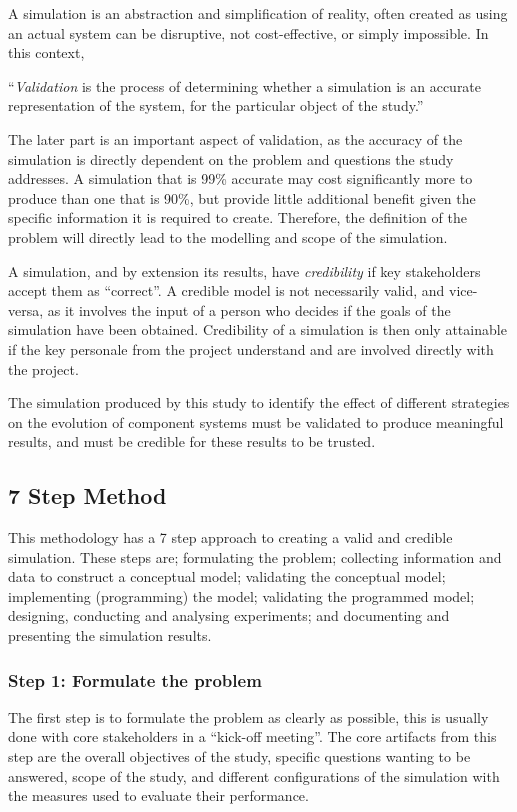 A simulation is an abstraction and simplification of reality, often created as using an actual system can be disruptive, not cost-effective, or simply impossible.
In this context,

``\textit{Validation} is the process of determining whether a simulation is an accurate representation of the system, for the particular object of the study.''

The later part is an important aspect of validation, as the accuracy of the simulation is directly dependent on the problem and questions the study addresses.
A simulation that is 99\% accurate may cost significantly more to produce than one that is 90\%, but provide little additional benefit given the specific information it is required to create.
Therefore, the definition of the problem will directly lead to the modelling and scope of the simulation.

A simulation, and by extension its results, have \textit{credibility} if key stakeholders accept them as ``correct''.
A credible model is not necessarily valid, and vice-versa, as it involves the input of a person who decides if the goals of the simulation have been obtained.
Credibility of a simulation is then only attainable if the key personale from the project understand and are involved directly with the project.

The simulation produced by this study to identify the effect of different strategies on the evolution of component systems must be validated to produce meaningful results,
and must be credible for these results to be trusted.

\subsection{7 Step Method}
This methodology has a 7 step approach to creating a valid and credible simulation.
These steps are; formulating the problem; collecting information and data to construct a conceptual model; validating the conceptual model;
implementing (programming) the model; validating the programmed model; designing, conducting and analysing experiments; and documenting and presenting the simulation results.

\subsubsection{Step 1: Formulate the problem}
The first step is to formulate the problem as clearly as possible, this is usually done with core stakeholders in a ``kick-off meeting''.
The core artifacts from this step are the overall objectives of the study, specific questions wanting to be answered, scope of the study,
 and different configurations of the simulation with the measures used to evaluate their performance. 

